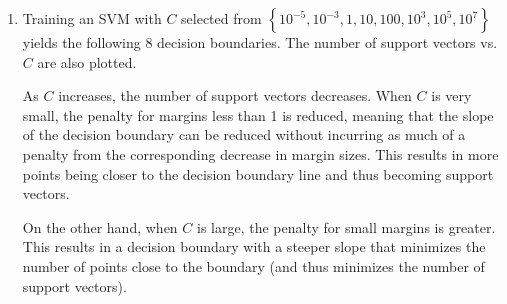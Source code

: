 \documentclass{article}
\begin{document}
\begin{enumerate}
\begin{enumerate}
			\item
				Training an SVM with $C$ selected from $\left\{ 10^{-5}, 10^{-3}, 1, 10, 100, 10^3, 10^5, 10^7 \right\}$ yields the following 8 decision boundaries. The number of support vectors vs. $C$ are also plotted.
			\begin{figure}[H]
				\centering
			\end{figure}
			As $C$ increases, the number of support vectors decreases. When $C$ is very small, the penalty for margins less than 1 is reduced, meaning that the slope of the decision boundary can be reduced without incurring as much of a penalty from the corresponding decrease in margin sizes. This results in more points being closer to the decision boundary line and thus becoming support vectors.

			On the other hand, when $C$ is large, the penalty for small margins is greater. This results in a decision boundary with a steeper slope that minimizes the number of points close to the boundary (and thus minimizes the number of support vectors).


\end{enumerate}
\end{enumerate}
\end{document}
